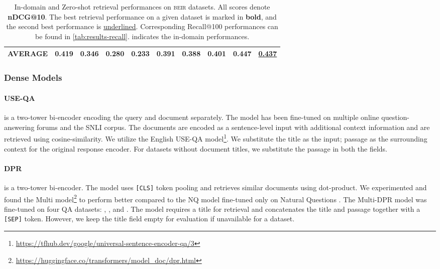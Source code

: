 \documentclass[11pt]{article}
\newcommand{\custo}[1]{\textsc{\normalsize #1}}
\newcommand{\beir}{\custo{beir}\xspace}
\begin{document}
\begin{table*}[t!]
{\begin{tabular}{l | c | c | c c c c c | c c}
   AVERAGE       & 0.419 & 0.346 & 0.280 & 0.233 & 0.391 & 0.388 & 0.401 & \textbf{0.447} & \underline{0.437} \\ 
        \bottomrule
    \end{tabular}}
    \caption{In-domain and Zero-shot retrieval performances on \beir datasets. All scores denote \textbf{nDCG@10}. The best retrieval performance on a given dataset is marked in \textbf{bold}, and the second best performance is \underline{underlined}. Corresponding Recall@100 performances can be found in \autoref{tab:results-recall}.  indicates the in-domain performances.}
    \label{tab:results}
\end{table*}

\subsubsection{Dense Models}

\paragraph{USE-QA} \cite{yang2020multilingual} is a two-tower bi-encoder encoding the query and document separately. The model has been fine-tuned on multiple online question-answering forums and the SNLI \cite{bowman-etal-2015-large} corpus. The documents are encoded as a sentence-level input with additional context information and are retrieved using cosine-similarity. We utilize the English USE-QA model\footnote{\href{https://tfhub.dev/google/universal-sentence-encoder-qa/3}{https://tfhub.dev/google/universal-sentence-encoder-qa/3}}. We substitute the title as the input; passage as the surrounding context for the original response encoder. For datasets without document titles, we substitute the passage in both the fields. 

\paragraph{DPR} \cite{karpukhin-etal-2020-dense} is a two-tower bi-encoder. The model uses \texttt{[CLS]} token pooling and retrieves similar documents using dot-product. 
We experimented and found the Multi model\footnote{\href{https://huggingface.co/transformers/model_doc/dpr.html}{https://huggingface.co/transformers/model\_doc/dpr.html}} to perform better compared to the NQ model fine-tuned only on Natural Questions \cite{47761}. The Multi-DPR model was fine-tuned on four QA datasets: \cite[NQ;][]{47761}, \cite[TriviaQA;][]{joshi-etal-2017-triviaqa}, \cite[WebQuestions;][]{berant-etal-2013-semantic} and \cite[CuratedTREC;][]{baudivs2015modeling}. The model requires a title for retrieval and concatenates the title and passage together with a \texttt{[SEP]} token. However, we keep the title field empty for evaluation if unavailable for a dataset.
\end{document}
